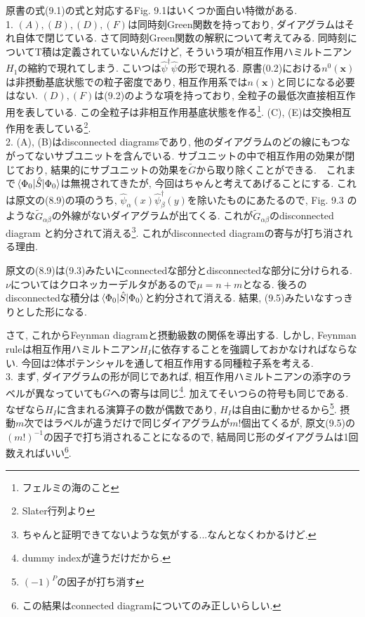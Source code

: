 \documentclass[10.5pt,a4paper]{jreport}
\newcommand{\bx}{\bm{x}}
\newcommand{\hpsi}{\hat{\psi}}
\begin{document}
原書の式(9.1)の式と対応するFig. 9.1はいくつか面白い特徴がある. \\

1. $(A), (B), (D), (F)$は同時刻Green関数を持っており, ダイアグラムはそれ自体で閉じている. さて同時刻Green関数の解釈について考えてみる. 同時刻についてT積は定義されていないんだけど, そういう項が相互作用ハミルトニアン$H_1$の縮約で現れてしまう. こいつは$\hpsi^\dagger\hpsi$の形で現れる. 原書(0.2)における$n^0(\bx)$は非摂動基底状態での粒子密度であり, 相互作用系では$n(\bx)$と同じになる必要はない. $(D), (F)$は(9.2)のような項を持っており, 全粒子の最低次直接相互作用を表している. この全粒子は非相互作用基底状態を作る\footnote{フェルミの海のこと}. (C), (E)は交換相互作用を表している\footnote{Slater行列より}.\\

2. (A), (B)はdisconnected diagramsであり, 他のダイアグラムのどの線にもつながってないサブユニットを含んでいる. サブユニットの中で相互作用の効果が閉じており, 結果的にサブユニットの効果を$\tilde{G}$から取り除くことができる.　これまで$\ev{\hat{S}}{\Phi_0}$は無視されてきたが, 今回はちゃんと考えてあげることにする. これは原文の(8.9)の項のうち, $\hpsi_\alpha(x)\hpsi_\beta^\dagger(y)$を除いたものにあたるので, Fig. 9.3 のような$\tilde{G}_{\alpha\beta}$の外線がないダイアグラムが出てくる. これが$\tilde{G}_{\alpha\beta}$のdisconnected diagram と約分されて消える\footnote{ちゃんと証明できてないような気がする...なんとなくわかるけど. }. これがdisconnected diagramの寄与が打ち消される理由.

原文の(8.9)は(9.3)みたいにconnectedな部分とdisconnectedな部分に分けられる. $\nu$についてはクロネッカーデルタがあるので$\mu = n + m$となる. 後ろのdisconnectedな積分は$\ev{\hat{S}}{\Phi_0}$と約分されて消える. 結果, (9.5)みたいなすっきりとした形になる.

さて, これからFeynman diagramと摂動級数の関係を導出する. しかし, Feynman ruleは相互作用ハミルトニアン$H_I$に依存することを強調しておかなければならない. 今回は2体ポテンシャルを通して相互作用する同種粒子系を考える. \\

3. まず, ダイアグラムの形が同じであれば, 相互作用ハミルトニアンの添字のラベルが異なっていても$G$への寄与は同じ\footnote{dummy indexが違うだけだから. }. 加えてそいつらの符号も同じである. なぜなら$H_I$に含まれる演算子の数が偶数であり, $H_I$は自由に動かせるから\footnote{$(-1)^P$の因子が打ち消す}. 摂動$m$次ではラベルが違うだけで同じダイアグラムが$m!$個出てくるが, 原文(9.5)の$(m!)^{-1}$の因子で打ち消されることになるので, 結局同じ形のダイアグラムは1回数えればいい\footnote{この結果はconnected diagramについてのみ正しいらしい. }.
\end{document}
